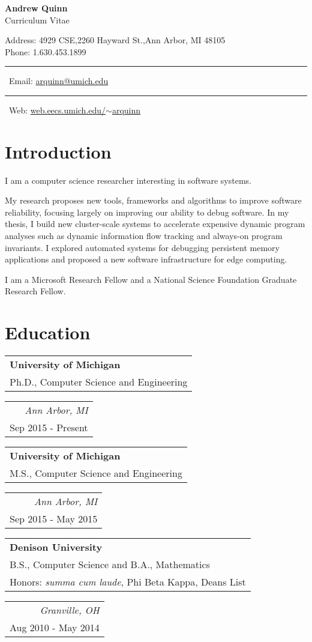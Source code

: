 \documentclass[letterpaper,10pt]{article}
\makeatletter
\def \name {Andrew Quinn}
\def \addr {4929 CSE,2260 Hayward St.,Ann Arbor, MI 48105}
\def \phone {1.630.453.1899}
\def \email {\href{mailto:arquinn@umich.edu}{arquinn@umich.edu}}
\def \website {\href{https://web.eecs.umich.edu/~arquinn}{web.eecs.umich.edu/$\sim$arquinn}}
\newcommand{\reitem}[2]{
  \begin{tabular}{l}
    #2
  \end{tabular}
\hfill
\begin{tabular}{r}
  #1
\end{tabular}
}
\newcommand{\blkSquare}{\ \rule[.2ex]{1ex}{1ex}\ }
\newcommand{\quadItem}[4]{\reitem{\emph{#1}\\#2}{\textbf{#3}\\#4}}
\makeatother
\begin{document}
\begin{center}
  \textbf{{\LARGE \name}} \\
  Curriculum Vitae
\end{center}
  Address: \addr\\
  Phone: \phone \blkSquare  Email: \email \blkSquare Web: \website\\

\section{Introduction}

I am a computer science researcher interesting in software systems.

My research proposes new tools, frameworks and algorithms to improve
software reliability, focusing largely on improving our ability to
debug software.  In my thesis, I build new cluster-scale systems to
accelerate expensive dynamic program analyses such as dynamic
information flow tracking and always-on program invariants.  I
explored automated systems for debugging persistent memory
applications and proposed a new software infrastructure for edge
computing.

I am a Microsoft Research Fellow and a National Science Foundation
Graduate Research Fellow.

\section{Education}

\quadItem{Ann Arbor, MI}{Sep 2015 - Present}{University of Michigan}{Ph.D., Computer Science and Engineering}

\quadItem{Ann Arbor, MI}{Sep 2015 - May 2015}{University of Michigan}{M.S., Computer Science and Engineering}

\quadItem{Granville, OH}{Aug 2010 - May 2014}{Denison University}{B.S.,
  Computer Science and B.A., Mathematics\\ Honors: \textit{summa cum
    laude}, Phi Beta Kappa, Deans List}
\end{document}

